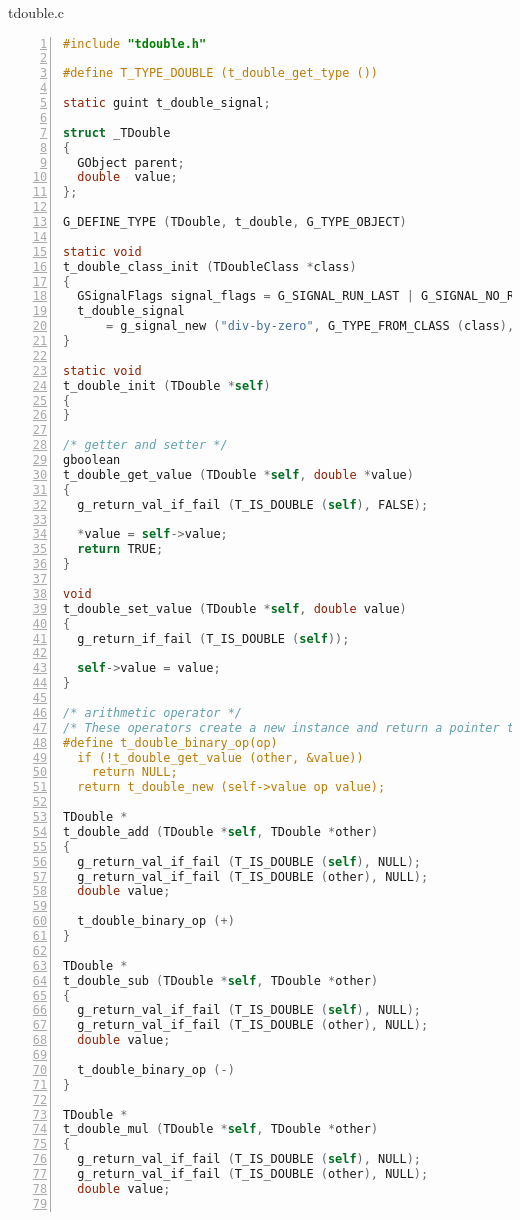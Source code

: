 tdouble.c

\begin{lstlisting}[language=C, numbers=left]
#include "tdouble.h"

#define T_TYPE_DOUBLE (t_double_get_type ())

static guint t_double_signal;

struct _TDouble
{
  GObject parent;
  double  value;
};

G_DEFINE_TYPE (TDouble, t_double, G_TYPE_OBJECT)

static void
t_double_class_init (TDoubleClass *class)
{
  GSignalFlags signal_flags = G_SIGNAL_RUN_LAST | G_SIGNAL_NO_RECURSE | G_SIGNAL_NO_HOOKS;
  t_double_signal
      = g_signal_new ("div-by-zero", G_TYPE_FROM_CLASS (class), signal_flags, 0, NULL, NULL, NULL, G_TYPE_NONE, 0);
}

static void
t_double_init (TDouble *self)
{
}

/* getter and setter */
gboolean
t_double_get_value (TDouble *self, double *value)
{
  g_return_val_if_fail (T_IS_DOUBLE (self), FALSE);

  *value = self->value;
  return TRUE;
}

void
t_double_set_value (TDouble *self, double value)
{
  g_return_if_fail (T_IS_DOUBLE (self));

  self->value = value;
}

/* arithmetic operator */
/* These operators create a new instance and return a pointer to it. */
#define t_double_binary_op(op)                                                                                         \
  if (!t_double_get_value (other, &value))                                                                             \
    return NULL;                                                                                                       \
  return t_double_new (self->value op value);

TDouble *
t_double_add (TDouble *self, TDouble *other)
{
  g_return_val_if_fail (T_IS_DOUBLE (self), NULL);
  g_return_val_if_fail (T_IS_DOUBLE (other), NULL);
  double value;

  t_double_binary_op (+)
}

TDouble *
t_double_sub (TDouble *self, TDouble *other)
{
  g_return_val_if_fail (T_IS_DOUBLE (self), NULL);
  g_return_val_if_fail (T_IS_DOUBLE (other), NULL);
  double value;

  t_double_binary_op (-)
}

TDouble *
t_double_mul (TDouble *self, TDouble *other)
{
  g_return_val_if_fail (T_IS_DOUBLE (self), NULL);
  g_return_val_if_fail (T_IS_DOUBLE (other), NULL);
  double value;


\end{lstlisting}
